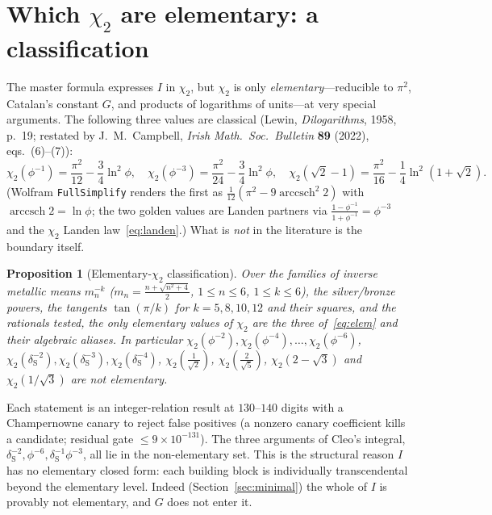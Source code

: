 \documentclass[11pt]{article}
\newcommand{\chitwo}{\chi_{2}}
\newcommand{\dS}{\delta_{\mathrm S}}
\theoremstyle{plain}\newtheorem{theorem}{Theorem}\newtheorem{proposition}[theorem]{Proposition}
\theoremstyle{remark}\newtheorem{remark}[theorem]{Remark}
\begin{document}
\section{Which $\chitwo$ are elementary: a classification}
The master formula expresses $I$ in $\chitwo$, but $\chitwo$ is only \emph{elementary}---reducible to
$\pi^2$, Catalan's constant $G$, and products of logarithms of units---at very special arguments. The
following three values are classical (Lewin, \emph{Dilogarithms}, 1958, p.~19; restated by J.~M.\
Campbell, \emph{Irish Math.\ Soc.\ Bulletin} \textbf{89} (2022), eqs.~(6)--(7)):
\begin{equation}\label{eq:elem}
  \chitwo(\phi^{-1})=\frac{\pi^2}{12}-\frac34\ln^2\phi,\quad
  \chitwo(\phi^{-3})=\frac{\pi^2}{24}-\frac34\ln^2\phi,\quad
  \chitwo(\sqrt2-1)=\frac{\pi^2}{16}-\frac14\ln^2(1+\sqrt2).
\end{equation}
(Wolfram \texttt{FullSimplify} renders the first as $\tfrac1{12}(\pi^2-9\operatorname{arccsch}^2 2)$ with
$\operatorname{arccsch}2=\ln\phi$; the two golden values are Landen partners via
$\tfrac{1-\phi^{-1}}{1+\phi^{-1}}=\phi^{-3}$ and the $\chitwo$ Landen law~\eqref{eq:landen}.) What is
\emph{not} in the literature is the boundary itself.
\begin{proposition}[Elementary-$\chitwo$ classification]\label{prop:class}
Over the families of inverse metallic means $m_n^{-k}$ ($m_n=\tfrac{n+\sqrt{n^2+4}}2$, $1\le n\le6$,
$1\le k\le6$), the silver/bronze powers, the tangents $\tan(\pi/k)$ for $k=5,8,10,12$ and their squares,
and the rationals tested, the \emph{only} elementary values of $\chitwo$ are the three of~\eqref{eq:elem}
and their algebraic aliases. In particular $\chitwo(\phi^{-2}),\chitwo(\phi^{-4}),\dots,\chitwo(\phi^{-6})$,
$\chitwo(\dS^{-2}),\chitwo(\dS^{-3}),\chitwo(\dS^{-4})$, $\chitwo(\tfrac1{\sqrt2})$, $\chitwo(\tfrac2{\sqrt5})$,
$\chitwo(2-\sqrt3)$ and $\chitwo(1/\sqrt3)$ are \emph{not} elementary.
\end{proposition}
Each statement is an integer-relation result at $130$--$140$ digits with a Champernowne canary to reject
false positives (a nonzero canary coefficient kills a candidate; residual gate $\le9\times10^{-131}$).
The three arguments of Cleo's integral, $\dS^{-2},\phi^{-6},\dS^{-1}\phi^{-3}$, all lie in the
non-elementary set. This is the structural reason $I$ has no elementary closed form: each building block
is individually transcendental beyond the elementary level. Indeed (Section~\ref{sec:minimal}) the whole
of $I$ is provably not elementary, and $G$ does not enter it.
\end{document}
